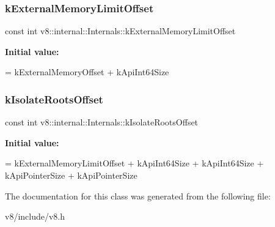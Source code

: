 \subsubsection{\texorpdfstring{k\+External\+Memory\+Limit\+Offset}{kExternalMemoryLimitOffset}}
{\footnotesize\ttfamily const int v8\+::internal\+::\+Internals\+::k\+External\+Memory\+Limit\+Offset\hspace{0.3cm}{\ttfamily [static]}}

{\bfseries Initial value\+:}
\begin{DoxyCode}
=
      kExternalMemoryOffset + kApiInt64Size
\end{DoxyCode}
\mbox{\label{classv8_1_1internal_1_1Internals_a3142f942a25203ce7fca0e9a4563c74d}} 
\subsubsection{\texorpdfstring{k\+Isolate\+Roots\+Offset}{kIsolateRootsOffset}}
{\footnotesize\ttfamily const int v8\+::internal\+::\+Internals\+::k\+Isolate\+Roots\+Offset\hspace{0.3cm}{\ttfamily [static]}}

{\bfseries Initial value\+:}
\begin{DoxyCode}
= kExternalMemoryLimitOffset +
                                         kApiInt64Size + kApiInt64Size +
                                         kApiPointerSize + kApiPointerSize
\end{DoxyCode}


The documentation for this class was generated from the following file\+:\begin{DoxyCompactItemize}
\item 
v8/include/v8.\+h\end{DoxyCompactItemize}

